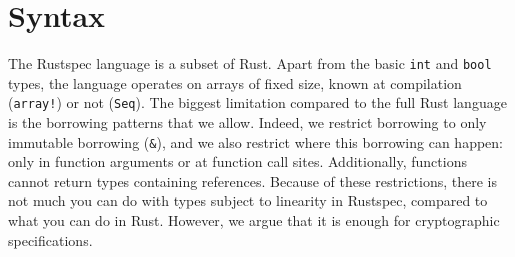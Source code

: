 \documentclass[11pt,a4paper]{article}
\newcommand{\rustspec}{\textsf{Rustspec}}
\newcommand{\syntext}[1]{\texttt{#1}}
\newcommand{\synkeyword}[1]{\textcolor{red!60!black}{\syntext{#1}}}
\newcommand{\synpunct}[1]{\textcolor{black!40!white}{\texttt{#1}}}
\newcommand{\synbool}{\synkeyword{bool}}
\newcommand{\synint}{\synkeyword{int}}
\newcommand{\synseq}{\syntext{Seq}}
\newcommand{\synarraymacro}{\synkeyword{array!}}
\newcommand{\synref}{\synpunct{\&}}
\begin{document}
\section{Syntax}

The \rustspec{} language is a subset of Rust. Apart from the basic \synint{} and \synbool{} types,
the language operates on arrays of fixed size, known at compilation (\synarraymacro{}) or not
(\synseq). The biggest limitation compared to the full Rust language is the borrowing patterns
that we allow. Indeed, we restrict borrowing to only immutable borrowing (\synref{}),
and we also restrict where this borrowing can happen: only in function arguments or at function call
sites. Additionally, functions cannot return types containing references. Because of these restrictions,
there is not much you can do with types subject to linearity in \rustspec, compared to what you
can do in Rust. However, we argue that it is enough for cryptographic specifications.
\end{document}
